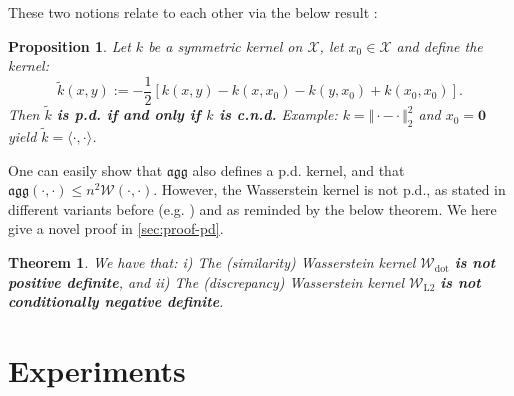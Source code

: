 \documentclass[letterpaper]{article} \usepackage{aaai22}  \usepackage{times}  \usepackage{helvet}  \usepackage{courier}  \usepackage[hyphens]{url}  \usepackage{graphicx} \urlstyle{rm} \def\UrlFont{\rm}  \usepackage{natbib}  \usepackage{caption} \DeclareCaptionStyle{ruled}{labelfont=normalfont,labelsep=colon,strut=off} \frenchspacing  \setlength{\pdfpagewidth}{8.5in}  \setlength{\pdfpageheight}{11in}  \usepackage{algorithm}
\newtheorem{theorem}{Theorem}
\newtheorem{proposition}{Proposition}
\newcommand{\Was}{{\mathcal W}}
\begin{document}
These two notions relate to each other via the below result \cite{boughorbel2005conditionally}:

\begin{proposition}\label{prop:cnd} Let $k$ be a symmetric kernel on $\mathcal{X}$, let $x_0\in\mathcal{X}$ and define the kernel:
\begin{equation}
\tilde{k}(x,y):=-\frac{1}{2}[k(x,y)-k(x,x_0)-k(y,x_0)+k(x_0,x_0)].
\end{equation}
Then $\tilde{k}$ \textbf{is p.d. if and only if $k$ is c.n.d.} Example: $k=\Vert\cdot-\cdot\Vert_2^2$ and $x_0=\textbf{0}$ yield $\tilde{k}=\langle\cdot,\cdot\rangle$.
\end{proposition}


One can easily show that $\mathfrak{agg}$ also defines a p.d. kernel, and that $\mathfrak{agg}(\cdot,\cdot)\leq n^2 \Was(\cdot,\cdot)$. However, the Wasserstein kernel is not p.d., as stated in different variants before (e.g. \cite{vert2008optimal}) and as reminded by the below theorem. We here give a novel proof in \cref{sec:proof-pd}.



\begin{theorem}
\label{thm:pd}
We have that: i) The (similarity) Wasserstein kernel $\Was_{\mathrm{dot}}$ \textbf{is not positive definite}, and ii) The (discrepancy) Wasserstein kernel $\Was_{\mathrm{L2}}$ \textbf{is not conditionally negative definite}.
\end{theorem}

\section{Experiments} \label{sec:exp}
\end{document}
